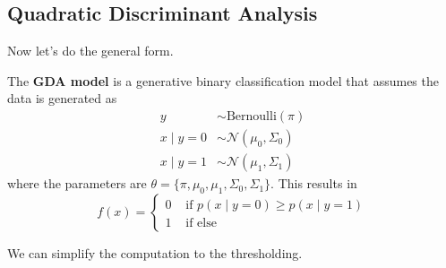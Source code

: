 \subsection{Quadratic Discriminant Analysis} 

  Now let's do the general form. 

  \begin{definition}
    \label{def:gaussian-discriminant-analysis}
 
    The \textbf{GDA model} is a generative binary classification model that assumes the data is generated as 
    \begin{align} 
      y & \sim \text{Bernoulli}(\pi) \\
      x \mid y = 0 & \sim \mathcal{N} (\mu_0, \Sigma_0) \\
      x \mid y = 1 & \sim \mathcal{N} (\mu_1, \Sigma_1)
    \end{align}
    where the parameters are $\theta = \{\pi, \mu_0, \mu_1, \Sigma_0, \Sigma_1\}$. This results in 
    \begin{equation}
      f(x) = \begin{cases} 
        0 & \text{ if } p(x \mid y = 0) \geq p(x \mid y = 1) \\  
        1 & \text{ if else}
      \end{cases}
    \end{equation}
  \end{definition} 

  \begin{theorem}
    \label{thm:maximum-likelihood-estimate}
    
  \end{theorem}

  We can simplify the computation to the thresholding.  

